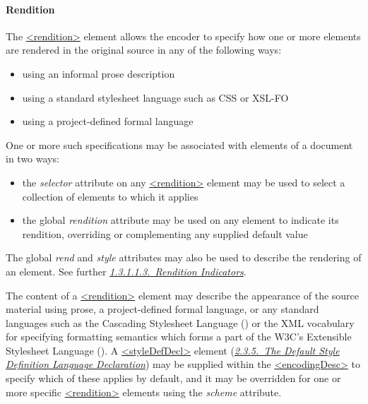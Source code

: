\paragraph[{Rendition}]{Rendition}\label{HD57-1}\par
The \hyperref[TEI.rendition]{<rendition>} element allows the encoder to specify how one or more elements are rendered in the original source in any of the following ways: \begin{itemize}
\item using an informal prose description
\item using a standard stylesheet language such as CSS or XSL-FO
\item using a project-defined formal language
\end{itemize} \par
One or more such specifications may be associated with elements of a document in two ways: \begin{itemize}
\item the {\itshape selector} attribute on any \hyperref[TEI.rendition]{<rendition>} element may be used to select a collection of elements to which it applies
\item the global {\itshape rendition} attribute may be used on any element to indicate its rendition, overriding or complementing any supplied default value
\end{itemize}  The global {\itshape rend} and {\itshape style} attributes may also be used to describe the rendering of an element. See further \textit{\hyperref[STGAre]{1.3.1.1.3.\ Rendition Indicators}}.\par
The content of a \hyperref[TEI.rendition]{<rendition>} element may describe the appearance of the source material using prose, a project-defined formal language, or any standard languages such as the Cascading Stylesheet Language (\cite{CSS21}) or the XML vocabulary for specifying formatting semantics which forms a part of the W3C's Extensible Stylesheet Language (\cite{XSL11}). A \hyperref[TEI.styleDefDecl]{<styleDefDecl>} element (\textit{\hyperref[HD57-1a]{2.3.5.\ The Default Style Definition Language Declaration}}) may be supplied within the \hyperref[TEI.encodingDesc]{<encodingDesc>} to specify which of these applies by default, and it may be overridden for one or more specific \hyperref[TEI.rendition]{<rendition>} elements using the {\itshape scheme} attribute.\par

